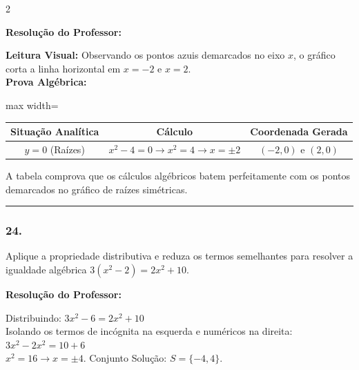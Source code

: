 \begin{multicols*}{2}
\ifgabarito
    \begin{tcolorbox}[colback=CorTitUm!5, colframe=CorTitUm, boxrule=1pt, arc=4pt, left=6pt, right=6pt, top=6pt, bottom=6pt]
    \small\textbf{\textcolor{CorTitUm}{Resolução do Professor:}}\par\vspace{0.1cm}
    \color{CinzaEscuro}
    \textbf{Leitura Visual:} Observando os pontos azuis demarcados no eixo $x$, o gráfico corta a linha horizontal em $x = -2$ e $x = 2$.\\
    \textbf{Prova Algébrica:}
    \vspace{0.1cm}
    \begin{center}
    \begin{adjustbox}{max width=\linewidth}
    \begin{tabular}{|c|c|c|}
    \hline
    \textbf{Situação Analítica} & \textbf{Cálculo} & \textbf{Coordenada Gerada} \\
    \hline
    $y = 0$ (Raízes) & $x^2 - 4 = 0 \rightarrow x^2 = 4 \rightarrow x = \pm 2$ & $(-2, 0)$ e $(2, 0)$ \\
    \hline
    \end{tabular}
    \end{adjustbox}
    \end{center}
    \vspace{0.1cm}
    A tabela comprova que os cálculos algébricos batem perfeitamente com os pontos demarcados no gráfico de raízes simétricas.
    \end{tcolorbox}
\fi

\par\vspace{\espacoQuestao}

\noindent\textcolor{CorLinha}{\rule{\linewidth}{0.5pt}} 
\par\vspace{\espacoPreQuestao}
\subsubsection*{24.} Aplique a propriedade distributiva e reduza os termos semelhantes para resolver a igualdade algébrica $ 3(x^2 - 2) = 2x^2 + 10 $.

\ifgabarito
    \begin{tcolorbox}[colback=CorTitUm!5, colframe=CorTitUm, boxrule=1pt, arc=4pt, left=6pt, right=6pt, top=6pt, bottom=6pt]
    \small\textbf{\textcolor{CorTitUm}{Resolução do Professor:}}\par\vspace{0.1cm}
    \color{CinzaEscuro}
    Distribuindo: $3x^2 - 6 = 2x^2 + 10$\\
    Isolando os termos de incógnita na esquerda e numéricos na direita:\\
    $3x^2 - 2x^2 = 10 + 6$\\
    $x^2 = 16 \rightarrow x = \pm 4$. Conjunto Solução: $S = \{-4, 4\}$.
    \end{tcolorbox}
\fi


\end{multicols*}
